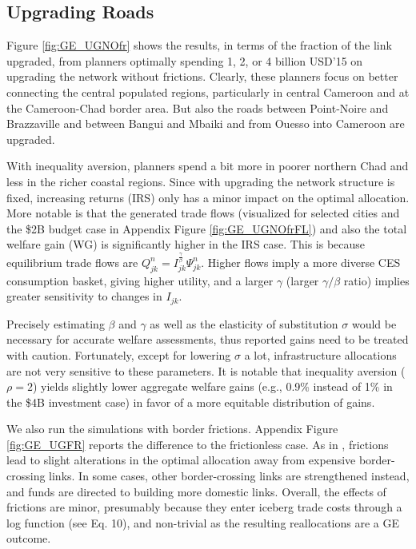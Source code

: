 \documentclass[a4paper]{article}
\begin{document}
\subsection{Upgrading Roads} 

Figure \ref{fig:GE_UGNOfr} shows the results, in terms of the fraction of the link upgraded, from planners optimally spending 1, 2, or 4 billion USD’15 on upgrading the network without frictions. Clearly, these planners focus on better connecting the central populated regions, particularly in central Cameroon and at the Cameroon-Chad border area. But also the roads between Point-Noire and Brazzaville and between Bangui and Mbaiki and from Ouesso into Cameroon are upgraded. \newline %

With inequality aversion, planners spend a bit more in poorer northern Chad and less in the richer coastal regions. Since with upgrading the network structure is fixed, increasing returns (IRS) only has a minor impact on the optimal allocation. More notable is that the generated trade flows (visualized for selected cities and the \$2B budget case in Appendix Figure \ref{fig:GE_UGNOfrFL}) and also the total welfare gain (WG) is significantly higher in the IRS case. This is because equilibrium trade flows are $Q^n_{jk} = I_{jk}^{\frac{\gamma}{\beta}}\Psi^n_{jk}$. Higher flows imply a more diverse CES consumption basket, giving higher utility, and a larger $\gamma$ (larger $\gamma/\beta$ ratio) implies greater sensitivity to changes in $I_{jk}$. %

Precisely estimating $\beta$ and $\gamma$ as well as the elasticity of substitution $\sigma$ would be necessary for accurate welfare assessments, thus reported gains need to be treated with caution. Fortunately, except for lowering $\sigma$ a lot, infrastructure allocations are not very sensitive to these parameters. It is notable that inequality aversion ($\rho = 2$) yields slightly lower aggregate welfare gains (e.g., 0.9\% instead of 1\% in the \$4B investment case) in favor of a more equitable distribution of gains. \newline 

We also run the simulations with border frictions. Appendix Figure \ref{fig:GE_UGFR} reports the difference to the frictionless case. As in \citet{krantz2024optimal}, frictions lead to slight alterations in the optimal allocation away from expensive border-crossing links. In some cases, other border-crossing links are strengthened instead, and funds are directed to building more domestic links. Overall, the effects of frictions are minor, presumably because they enter iceberg trade costs through a log function (see \citet{krantz2024optimal} Eq. 10), and non-trivial as the resulting reallocations are a GE outcome. \newline 
\end{document}
